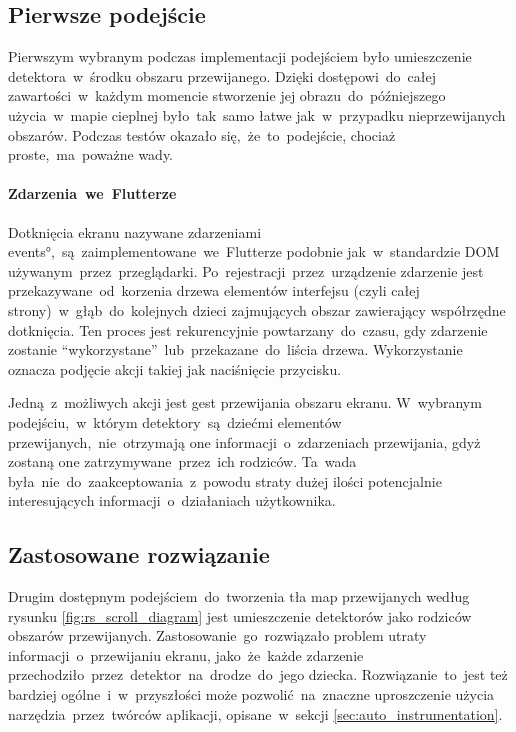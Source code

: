 
\subsection{Pierwsze podejście}
Pierwszym wybranym podczas implementacji podejściem było umieszczenie detektora~w~środku obszaru przewijanego. Dzięki dostępowi~do~całej zawartości~w~każdym momencie stworzenie jej obrazu~do~późniejszego użycia~w~mapie cieplnej było~tak~samo łatwe jak~w~przypadku nieprzewijanych obszarów. Podczas testów okazało się,~że~to~podejście, chociaż proste,~ma~poważne wady.

\paragraph{Zdarzenia~we~Flutterze}
Dotknięcia ekranu nazywane zdarzeniami \ang{events},~są~zaimplementowane~we~Flutterze podobnie jak~w~standardzie DOM używanym~przez~przeglądarki. Po~rejestracji~przez~urządzenie zdarzenie jest przekazywane~od~korzenia drzewa elementów interfejsu (czyli całej strony)~w~głąb~do~kolejnych dzieci zajmujących obszar zawierający współrzędne dotknięcia. Ten proces jest rekurencyjnie powtarzany~do~czasu, gdy zdarzenie zostanie ``wykorzystane''~lub~przekazane~do~liścia drzewa. Wykorzystanie oznacza podjęcie akcji takiej jak naciśnięcie przycisku.

Jedną~z~możliwych akcji jest gest przewijania obszaru ekranu. W~wybranym podejściu,~w~którym detektory~są~dziećmi elementów przewijanych,~nie~otrzymają one informacji~o~zdarzeniach przewijania, gdyż zostaną one zatrzymywane~przez~ich rodziców. Ta~wada była~nie~do~zaakceptowania~z~powodu straty dużej ilości potencjalnie interesujących informacji~o~działaniach użytkownika.

\subsection{Zastosowane rozwiązanie}
Drugim dostępnym podejściem~do~tworzenia tła map przewijanych według rysunku \ref{fig:rs_scroll_diagram} jest umieszczenie detektorów jako rodziców obszarów przewijanych. Zastosowanie~go~rozwiązało problem utraty informacji~o~przewijaniu ekranu, jako~że~każde zdarzenie przechodziło~przez~detektor~na~drodze~do~jego dziecka. Rozwiązanie~to~jest też bardziej ogólne~i~w~przyszłości może pozwolić~na~znaczne uproszczenie użycia narzędzia~przez~twórców aplikacji, opisane~w~sekcji \ref{sec:auto_instrumentation}. 


